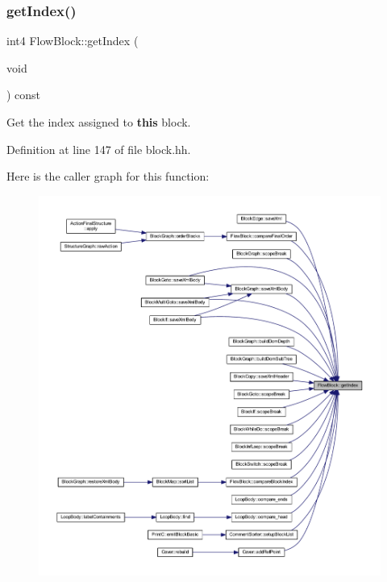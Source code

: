 \mbox{\label{class_flow_block_a1830ec9a8397398dd1633cdd8ca56152}} 
\subsubsection{\texorpdfstring{getIndex()}{getIndex()}}
{\footnotesize\ttfamily int4 Flow\+Block\+::get\+Index (\begin{DoxyParamCaption}\item[{void}]{ }\end{DoxyParamCaption}) const\hspace{0.3cm}{\ttfamily [inline]}}



Get the index assigned to {\bfseries{this}} block. 



Definition at line 147 of file block.\+hh.

Here is the caller graph for this function\+:
\nopagebreak
\begin{figure}[H]
\begin{center}
\leavevmode
\includegraphics[width=350pt]{class_flow_block_a1830ec9a8397398dd1633cdd8ca56152_icgraph}
\end{center}
\end{figure}
\mbox{\label{class_flow_block_aa7e3329c296bc6ac805cc067aa4c301e}} 
